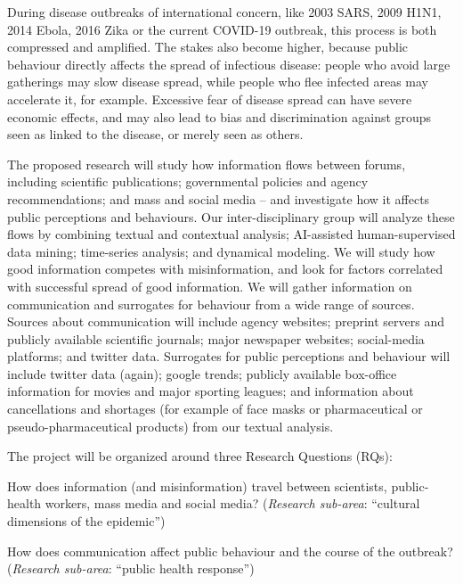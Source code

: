 


During disease outbreaks of international concern, like 2003 SARS, 2009 H1N1, 2014 Ebola, 2016 Zika   or the current COVID-19 outbreak, this process  is both compressed and amplified. The stakes also become higher, because public behaviour directly affects the spread of infectious disease: people who avoid large gatherings may slow disease spread, while people who flee infected areas may accelerate it, for example. Excessive fear of disease spread can have severe economic effects, and may also lead to bias and discrimination against groups seen as linked to the disease, or merely seen as others. 

The proposed research will study how information flows between forums, including scientific publications; governmental policies and agency recommendations; and mass and social media -- and investigate how it affects public perceptions and behaviours. 
Our inter-disciplinary group will analyze these flows by combining textual and contextual analysis; AI-assisted human-supervised data mining; time-series analysis; and dynamical modeling. We will study how good information competes with misinformation, and look for factors correlated with successful spread of good information. 
We will gather information on communication and surrogates for behaviour from a wide range of sources. 
Sources about communication will include agency websites; preprint servers and publicly available scientific journals; major newspaper websites; social-media platforms; and twitter data.
Surrogates for public perceptions and behaviour will include twitter data (again); google trends; publicly available box-office information for movies and major sporting leagues; and information about cancellations and shortages (for example of face masks or pharmaceutical or pseudo-pharmaceutical products) from our textual analysis. 

The project will be organized around three Research Questions (RQs):

 How does information (and misinformation) travel between scientists, public-health workers, mass media and social media? (\emph{Research sub-area}: ``cultural dimensions of the epidemic'')

 How does communication affect public behaviour and the course of the outbreak? (\emph{Research sub-area}: ``public health response'')  

